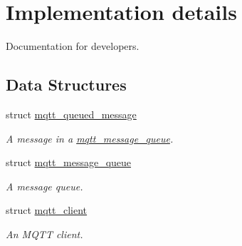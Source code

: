 \hypertarget{group__details}{}\section{Implementation details}
\label{group__details}


Documentation for developers.  


\subsection*{Data Structures}
\begin{DoxyCompactItemize}
\item 
struct \hyperlink{structmqtt__queued__message}{mqtt\+\_\+queued\+\_\+message}
\begin{DoxyCompactList}\small\item\em A message in a \hyperlink{structmqtt__message__queue}{mqtt\+\_\+message\+\_\+queue}. \end{DoxyCompactList}\item 
struct \hyperlink{structmqtt__message__queue}{mqtt\+\_\+message\+\_\+queue}
\begin{DoxyCompactList}\small\item\em A message queue. \end{DoxyCompactList}\item 
struct \hyperlink{structmqtt__client}{mqtt\+\_\+client}
\begin{DoxyCompactList}\small\item\em An M\+Q\+TT client. \end{DoxyCompactList}\end{DoxyCompactItemize}
